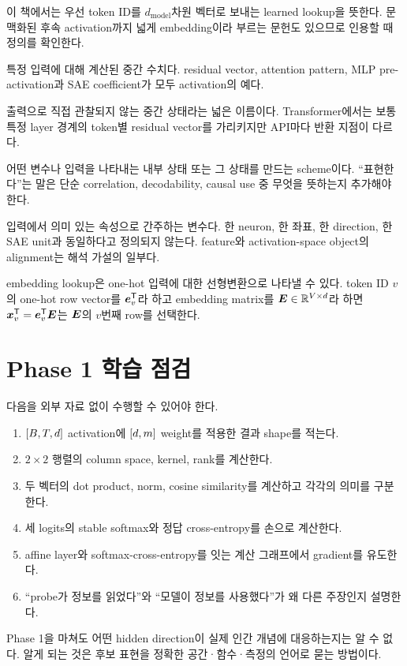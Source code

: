 \begin{description}[style=nextline]
  \item[embedding]
  이 책에서는 우선 token ID를 $d_{\text{model}}$차원 벡터로 보내는 learned lookup을 뜻한다.
  문맥화된 후속 activation까지 넓게 embedding이라 부르는 문헌도 있으므로 인용할 때 정의를 확인한다.

  \item[activation]
  특정 입력에 대해 계산된 중간 수치다.
  residual vector, attention pattern, MLP pre-activation과 SAE coefficient가 모두 activation의 예다.

  \item[hidden state]
  출력으로 직접 관찰되지 않는 중간 상태라는 넓은 이름이다.
  Transformer에서는 보통 특정 layer 경계의 token별 residual vector를 가리키지만 API마다 반환 지점이 다르다.

  \item[representation]
  어떤 변수나 입력을 나타내는 내부 상태 또는 그 상태를 만드는 scheme이다.
  ``표현한다''는 말은 단순 correlation, decodability, causal use 중 무엇을 뜻하는지 추가해야 한다.

  \item[feature]
  입력에서 의미 있는 속성으로 간주하는 변수다.
  한 neuron, 한 좌표, 한 direction, 한 SAE unit과 동일하다고 정의되지 않는다.
  feature와 activation-space object의 alignment는 해석 가설의 일부다.
\end{description}

\begin{example}
embedding lookup은 one-hot 입력에 대한 선형변환으로 나타낼 수 있다.
token ID $v$의 one-hot row vector를 $\bm{e}_v^{\mathsf T}$라 하고 embedding matrix를 $\bm{E}\in\mathbb{R}^{V\times d}$라 하면 $\bm{x}_v^{\mathsf T}=\bm{e}_v^{\mathsf T}\bm{E}$는 $\bm{E}$의 $v$번째 row를 선택한다.
\end{example}

\section{Phase 1 학습 점검}

\begin{studybox}
다음을 외부 자료 없이 수행할 수 있어야 한다.
\begin{enumerate}
  \item $\left[B,T,d\right]$ activation에 $\left[d,m\right]$ weight를 적용한 결과 shape를 적는다.
  \item $2\times2$ 행렬의 column space, kernel, rank를 계산한다.
  \item 두 벡터의 dot product, norm, cosine similarity를 계산하고 각각의 의미를 구분한다.
  \item 세 logits의 stable softmax와 정답 cross-entropy를 손으로 계산한다.
  \item affine layer와 softmax-cross-entropy를 잇는 계산 그래프에서 gradient를 유도한다.
  \item ``probe가 정보를 읽었다''와 ``모델이 정보를 사용했다''가 왜 다른 주장인지 설명한다.
\end{enumerate}
\end{studybox}

\begin{limitbox}
Phase 1을 마쳐도 어떤 hidden direction이 실제 인간 개념에 대응하는지는 알 수 없다.
알게 되는 것은 후보 표현을 정확한 공간·함수·측정의 언어로 묻는 방법이다.
\end{limitbox}
